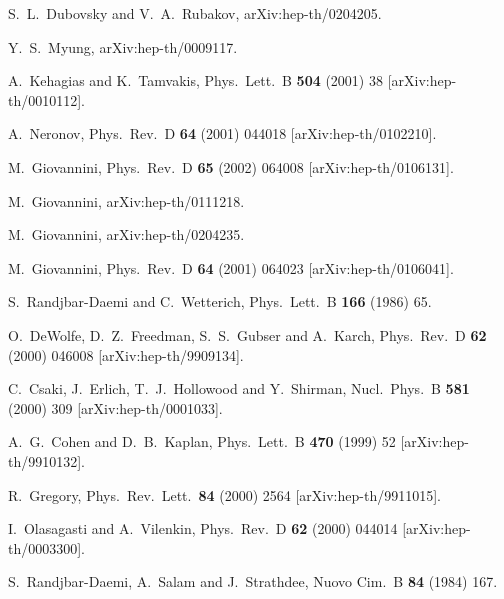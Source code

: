 \documentclass[a4paper,12pt]{article}
\begin{document}
\begin{thebibliography}{99}
S.~L.~Dubovsky and V.~A.~Rubakov,
arXiv:hep-th/0204205.

Y.~S.~Myung,
arXiv:hep-th/0009117.

A.~Kehagias and K.~Tamvakis,
Phys.\ Lett.\ B {\bf 504} (2001) 38
[arXiv:hep-th/0010112].

A.~Neronov,
Phys.\ Rev.\ D {\bf 64} (2001) 044018
[arXiv:hep-th/0102210].

M.~Giovannini,
Phys.\ Rev.\ D {\bf 65} (2002) 064008
[arXiv:hep-th/0106131].

M.~Giovannini,
arXiv:hep-th/0111218.

M.~Giovannini,
arXiv:hep-th/0204235.


M.~Giovannini,
Phys.\ Rev.\ D {\bf 64} (2001) 064023
[arXiv:hep-th/0106041].

S.~Randjbar-Daemi and C.~Wetterich,
Phys.\ Lett.\ B {\bf 166} (1986) 65.

O.~DeWolfe, D.~Z.~Freedman, S.~S.~Gubser and A.~Karch,
Phys.\ Rev.\ D {\bf 62} (2000) 046008
[arXiv:hep-th/9909134].

C.~Csaki, J.~Erlich, T.~J.~Hollowood and Y.~Shirman,
Nucl.\ Phys.\ B {\bf 581} (2000) 309
[arXiv:hep-th/0001033].

A.~G.~Cohen and D.~B.~Kaplan,
Phys.\ Lett.\ B {\bf 470} (1999) 52
[arXiv:hep-th/9910132].

R.~Gregory,
Phys.\ Rev.\ Lett.\  {\bf 84} (2000) 2564
[arXiv:hep-th/9911015].

I.~Olasagasti and A.~Vilenkin,
Phys.\ Rev.\ D {\bf 62} (2000) 044014
[arXiv:hep-th/0003300].

S.~Randjbar-Daemi, A.~Salam and J.~Strathdee,
Nuovo Cim.\ B {\bf 84} (1984) 167.


\end{thebibliography}
\end{document}
